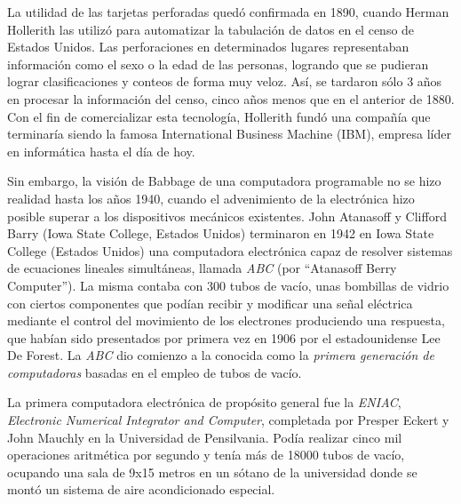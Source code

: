 \documentclass[
]{book}
\begin{document}
La utilidad de las tarjetas perforadas quedó confirmada en 1890, cuando Herman Hollerith las utilizó para automatizar la tabulación de datos en el censo de Estados Unidos. Las perforaciones en determinados lugares representaban información como el sexo o la edad de las personas, logrando que se pudieran lograr clasificaciones y conteos de forma muy veloz. Así, se tardaron sólo 3 años en procesar la información del censo, cinco años menos que en el anterior de 1880. Con el fin de comercializar esta tecnología, Hollerith fundó una compañía que terminaría siendo la famosa International Business Machine (IBM), empresa líder en informática hasta el día de hoy.

Sin embargo, la visión de Babbage de una computadora programable no se hizo realidad hasta los años 1940, cuando el advenimiento de la electrónica hizo posible superar a los dispositivos mecánicos existentes. John Atanasoff y Clifford Barry (Iowa State College, Estados Unidos) terminaron en 1942 en Iowa State College (Estados Unidos) una computadora electrónica capaz de resolver sistemas de ecuaciones lineales simultáneas, llamada \emph{ABC} (por ``Atanasoff Berry Computer''). La misma contaba con 300 tubos de vacío, unas bombillas de vidrio con ciertos componentes que podían recibir y modificar una señal eléctrica mediante el control del movimiento de los electrones produciendo una respuesta, que habían sido presentados por primera vez en 1906 por el estadounidense Lee De Forest. La \emph{ABC} dio comienzo a la conocida como la \emph{primera generación de computadoras} basadas en el empleo de tubos de vacío.

La primera computadora electrónica de propósito general fue la \emph{ENIAC}, \emph{Electronic Numerical Integrator and Computer}, completada por Presper Eckert y John Mauchly en la Universidad de Pensilvania. Podía realizar cinco mil operaciones aritmética por segundo y tenía más de 18000 tubos de vacío, ocupando una sala de 9x15 metros en un sótano de la universidad donde se montó un sistema de aire acondicionado especial.
\end{document}
